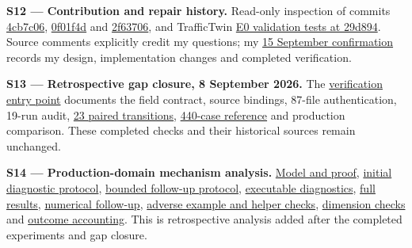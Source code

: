 \documentclass[12pt,a4paper]{article}
\begin{document}
\textbf{S12 --- Contribution and repair history.} Read-only inspection of  commits \href{\detokenize{https://github.com/Abdulla4akash/vec_env/commit/4cb7c06aab1b455d68f71ea9143172463784dea9}}{4cb7c06}, \href{\detokenize{https://github.com/Abdulla4akash/vec_env/commit/0f01f4d2082d3e8b735e74a873095ab8eeba37cc}}{0f01f4d} and \href{\detokenize{https://github.com/Abdulla4akash/vec_env/commit/2f63706f46319433a2ba3af1df97afd0e56a95d1}}{2f63706}, and TrafficTwin \href{\detokenize{https://github.com/Abdulla4akash/traffictwin/blob/29d8945862b7df1bd5d7879ba1d980a388f6be0d/tests/test_validate_e0_smoke.py}}{E0 validation tests at 29d894}. Source comments explicitly credit my questions; my \href{\detokenize{AUTHOR_ACTIONS.md}}{15 September confirmation} records my design, implementation changes and completed verification.

\label{source-s13}

\textbf{S13 --- Retrospective gap closure, 8 September 2026.} The \href{\detokenize{../gap_closure_2026-09-08/verification/README.md}}{verification entry point} documents the field contract, source bindings, 87-file authentication, 19-run audit, \href{\detokenize{../gap_closure_2026-09-08/verification/results/OUTCOME_TRANSITIONS.json}}{23 paired transitions}, \href{\detokenize{../gap_closure_2026-09-08/verification/results/KERNEL_RESULTS.json}}{440-case reference} and production comparison. These completed checks and their historical sources remain unchanged.

\label{source-s14}

\textbf{S14 --- Production-domain mechanism analysis.} \href{\detokenize{../production_mechanism_2026-09-08/analysis/MATHEMATICS.md}}{Model and proof}, \href{\detokenize{../production_mechanism_2026-09-08/analysis/PROTOCOL.md}}{initial diagnostic protocol}, \href{\detokenize{../production_mechanism_2026-09-08/analysis/FOLLOWUP_PROTOCOL.md}}{bounded follow-up protocol}, \href{\detokenize{../production_mechanism_2026-09-08/analysis/diagnostics.py}}{executable diagnostics}, \href{\detokenize{../production_mechanism_2026-09-08/analysis/results/DIAGNOSTICS.json}}{full results}, \href{\detokenize{../production_mechanism_2026-09-08/analysis/results/NUMERICAL_FOLLOWUP.json}}{numerical follow-up}, \href{\detokenize{../production_mechanism_2026-09-08/analysis/results/ADVERSE_PRODUCTION.json}}{adverse example and helper checks}, \href{\detokenize{../production_mechanism_2026-09-08/analysis/results/DIMENSION_CHECK.json}}{dimension checks} and \href{\detokenize{../production_mechanism_2026-09-08/analysis/results/OUTCOME_ACCOUNTING.json}}{outcome accounting}. This is retrospective analysis added after the completed experiments and gap closure.
\end{document}
